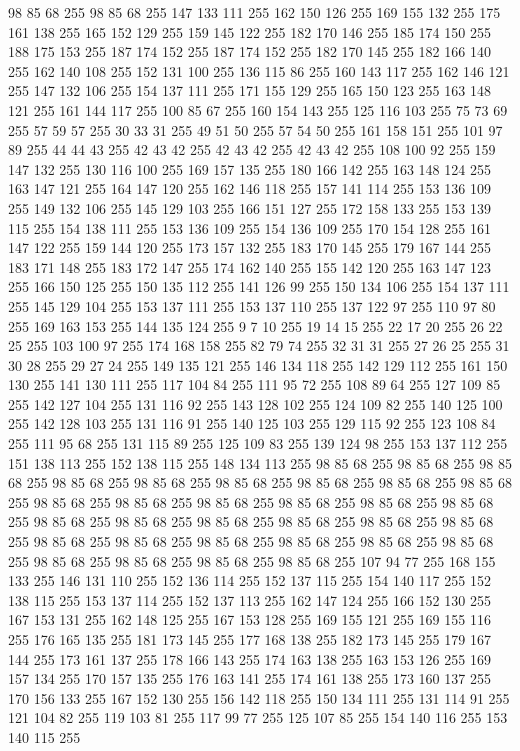 98 85 68 255 98 85 68 255 147 133 111 255 162 150 126 255 169 155 132 255 175 161 138 255 165 152 129 255 159 145 122 255 182 170 146 255 185 174 150 255 188 175 153 255 187 174 152 255 187 174 152 255 182 170 145 255 182 166 140 255 162 140 108 255 152 131 100 255 136 115 86 255 160 143 117 255 162 146 121 255 147 132 106 255 154 137 111 255 171 155 129 255 165 150 123 255 163 148 121 255 161 144 117 255 100 85 67 255 160 154 143 255 125 116 103 255 75 73 69 255 57 59 57 255 30 33 31 255 49 51 50 255 57 54 50 255 161 158 151 255 101 97 89 255 44 44 43 255 42 43 42 255 42 43 42 255 42 43 42 255 108 100 92 255 159 147 132 255 130 116 100 255 169 157 135 255 180 166 142 255 163 148 124 255 163 147 121 255 164 147 120 255 162 146 118 255 157 141 114 255 153 136 109 255 149 132 106 255 145 129 103 255 166 151 127 255 172 158 133 255 153 139 115 255 154 138 111 255 153 136 109 255 154 136 109 255 170 154 128 255 161 147 122 255 159 144 120 255 173 157 132 255 183 170 145 255
179 167 144 255 183 171 148 255 183 172 147 255 174 162 140 255 155 142 120 255 163 147 123 255 166 150 125 255 150 135 112 255 141 126 99 255 150 134 106 255 154 137 111 255 145 129 104 255 153 137 111 255 153 137 110 255 137 122 97 255 110 97 80 255 169 163 153 255 144 135 124 255 9 7 10 255 19 14 15 255 22 17 20 255 26 22 25 255 103 100 97 255 174 168 158 255 82 79 74 255 32 31 31 255 27 26 25 255 31 30 28 255 29 27 24 255 149 135 121 255 146 134 118 255 142 129 112 255 161 150 130 255 141 130 111 255 117 104 84 255 111 95 72 255 108 89 64 255 127 109 85 255 142 127 104 255 131 116 92 255 143 128 102 255 124 109 82 255 140 125 100 255 142 128 103 255 131 116 91 255 140 125 103 255 129 115 92 255 123 108 84 255 111 95 68 255 131 115 89 255 125 109 83 255 139 124 98 255 153 137 112 255 151 138 113 255 152 138 115 255 148 134 113 255 98 85 68 255 98 85 68 255 98 85 68 255 98 85 68 255 98 85 68 255 98 85 68 255 98 85 68 255 98 85 68 255
98 85 68 255 98 85 68 255 98 85 68 255 98 85 68 255 98 85 68 255 98 85 68 255 98 85 68 255 98 85 68 255 98 85 68 255 98 85 68 255 98 85 68 255 98 85 68 255 98 85 68 255 98 85 68 255 98 85 68 255 98 85 68 255 98 85 68 255 98 85 68 255 98 85 68 255 98 85 68 255 98 85 68 255 98 85 68 255 98 85 68 255 107 94 77 255 168 155 133 255 146 131 110 255 152 136 114 255 152 137 115 255 154 140 117 255 152 138 115 255 153 137 114 255 152 137 113 255 162 147 124 255 166 152 130 255 167 153 131 255 162 148 125 255 167 153 128 255 169 155 121 255 169 155 116 255 176 165 135 255 181 173 145 255 177 168 138 255 182 173 145 255 179 167 144 255 173 161 137 255 178 166 143 255 174 163 138 255 163 153 126 255 169 157 134 255 170 157 135 255 176 163 141 255 174 161 138 255 173 160 137 255 170 156 133 255 167 152 130 255 156 142 118 255 150 134 111 255 131 114 91 255 121 104 82 255 119 103 81 255 117 99 77 255 125 107 85 255 154 140 116 255 153 140 115 255
